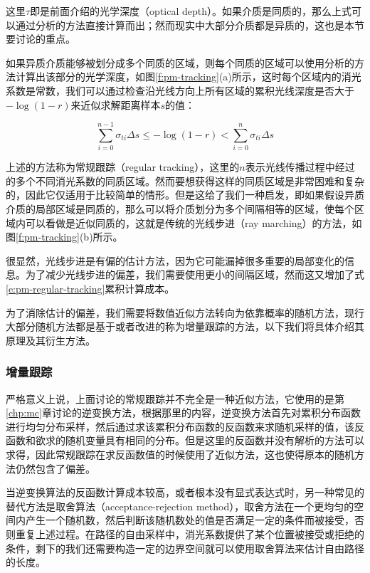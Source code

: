 这里$\tau$即是前面介绍的光学深度（optical depth）。如果介质是同质的，那么上式可以通过分析的方法直接计算而出；然而现实中大部分介质都是异质的，这也是本节要讨论的重点。

如果异质介质能够被划分成多个同质的区域，则每个同质的区域可以使用分析的方法计算出该部分的光学深度，如图\ref{f:pm-tracking}(a)所示，这时每个区域内的消光系数是常数，我们可以通过检查沿光线方向上所有区域的累积光线深度是否大于$-\log(1-r)$来近似求解距离样本$s$的值：

\begin{equation}\label{e:pm-regular-tracking}
	\sum^{n-1}_{i=0}\sigma_{ti}\Delta s\leq-\log(1-r)<\sum^{n}_{i=0}\sigma_{ti}\Delta s
\end{equation}

上述的方法称为常规跟踪（regular tracking），这里的$n$表示光线传播过程中经过的多个不同消光系数的同质区域。然而要想获得这样的同质区域是非常困难和复杂的，因此它仅适用于比较简单的情形。但是这给了我们一种启发，即如果假设异质介质的局部区域是同质的，那么可以将介质划分为多个间隔相等的区域，使每个区域内可以看做是近似同质的，这就是传统的光线步进（ray marching）的方法，如图\ref{f:pm-tracking}(b)所示。

很显然，光线步进是有偏的估计方法，因为它可能漏掉很多重要的局部变化的信息。为了减少光线步进的偏差，我们需要使用更小的间隔区域，然而这又增加了式\ref{e:pm-regular-tracking}累积计算成本。

为了消除估计的偏差，我们需要将数值近似方法转向为依靠概率的随机方法，现行大部分随机方法都是基于或者改进的称为增量跟踪的方法，以下我们将具体介绍其原理及其衍生方法。




\subsubsection{增量跟踪}\label{sec:pm-delta-tracking}
严格意义上说，上面讨论的常规跟踪并不完全是一种近似方法，它使用的是第\ref{chp:mc}章讨论的逆变换方法，根据那里的内容，逆变换方法首先对累积分布函数进行均匀分布采样，然后通过求该累积分布函数的反函数来求随机采样的值，该反函数和欲求的随机变量具有相同的分布。但是这里的反函数并没有解析的方法可以求得，因此常规跟踪在求反函数值的时候使用了近似方法，这也使得原本的随机方法仍然包含了偏差。

当逆变换算法的反函数计算成本较高，或者根本没有显式表达式时，另一种常见的替代方法是取舍算法（acceptance-rejection method），取舍方法在一个更均匀的空间内产生一个随机数，然后判断该随机数处的值是否满足一定的条件而被接受，否则重复上述过程。在路径的自由采样中，消光系数提供了某个位置被接受或拒绝的条件，剩下的我们还需要构造一定的边界空间就可以使用取舍算法来估计自由路径的长度。


